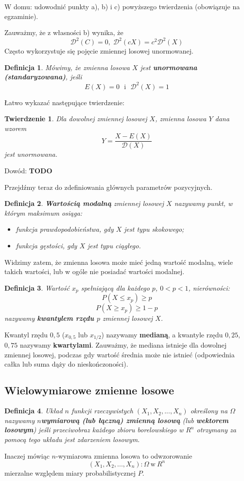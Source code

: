 \documentclass[10pt,a4paper]{article}
\newtheorem{definition}{Definicja}[section]
\newtheorem{theorem}{Twierdzenie}[section]
\begin{document}
W domu: udowodnić punkty a), b) i c) powyższego twierdzenia (obowiązuje na
egzaminie).

Zauważmy, że z własności b) wynika, że
\[
  \mathscr{D}^2(C) = 0,\;\mathscr{D}^2(cX) = c^2\mathscr{D}^2(X)
\]
Często wykorzystuje się pojęcie zmiennej losowej unormowanej.
\begin{definition}
Mówimy, że zmienna losowa $X$ jest \textbf{unormowana (standaryzowana)}, jeśli
\[E(X) = 0 \textrm{~~i~~} \mathscr{D}^2(X)=1\] 
\end{definition}
Łatwo wykazać następujące twierdzenie:
\begin{theorem}
Dla dowolnej zmiennej losowej $X$, zmienna losowa $Y$ dana wzorem
\[Y=\frac{X-E(X)}{\mathscr{D}(X)}\]
jest unormowana.
\end{theorem}
Dowód: \textbf{TODO}

Przejdźmy teraz do zdefiniowania głównych parametrów pozycyjnych.
\begin{definition}
\textbf{Wartością modalną} zmiennej losowej $X$ nazywamy punkt, w którym maksimum osiąga:
\begin{itemize}
\item funkcja prawdopodobieństwa, gdy $X$ jest typu skokowego;
\item funkcja gęstości, gdy $X$ jest typu ciągłego.
\end{itemize}
\end{definition}
Widzimy zatem, że zmienna losowa może mieć jedną wartość modalną, wiele takich wartości, lub w ogóle nie posiadać wartości modalnej.
\begin{definition}
Wartość $x_p$ spełniającą dla każdego $p$, $0<p<1$, nierówności:
\[P(X\leq x_p)\geq p\]
\[P(X\geq x_p)\geq 1-p\]
nazywamy \textbf{kwantylem rzędu $p$} zmiennej losowej $X$.
\end{definition}
Kwantyl rzędu $0,5$ ($x_{0,5}$ lub $x_{1/2}$) nazywamy \textbf{medianą}, a kwantyle rzędu $0,25$, $0,75$ nazywamy \textbf{kwartylami}.
Zauważmy, że mediana istnieje dla dowolnej zmiennej losowej, podczas gdy wartość średnia może nie istnieć (odpowiednia całka lub suma dąży do nieskończoności).
\subsection{Wielowymiarowe zmienne losowe}
\begin{definition}
Układ $n$ funkcji rzeczywistych $(X_1,X_2,...,X_n)$ określony na $\Omega$ nazywamy \textbf{$n$\dywiz wymiarową (lub łączną) zmienną losową} (lub \textbf{wektorem losowym}) jeśli przeciwobraz każdego zbioru borelowskiego w $R^n$ otrzymany za pomocą tego układu jest zdarzeniem losowym.
\end{definition}
Inaczej mówiąc $n$-wymiarowa zmienna losowa to odwzorowanie 
\[(X_1,X_2,...,X_n):\Omega~\textrm{w}~R^n\]
mierzalne względem miary probabilistycznej $P$.
\end{document}
